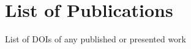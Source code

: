 \documentclass[PhD,synopsis,BlueTape]{iitmdiss}
\begin{document}

%




\section{List of Publications}
List of DOIs of any published or presented work

%

\small %
	
\end{document}
